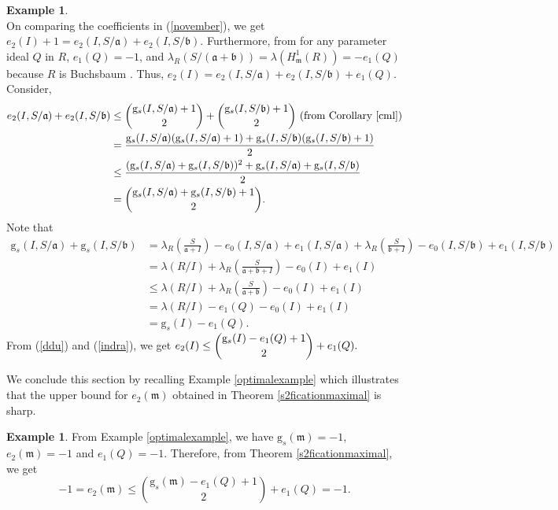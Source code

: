 \documentclass[reqno,a4paper,dvipsnames]{amsart}
\newcommand{\m}{\mathfrak{m} }
\theoremstyle{definition}
\newtheorem{example}[theorem]{Example}
\begin{document}
\begin{example}
\begin{equation}
     \end{equation}
     On comparing the coefficients in (\ref{november}), we get 
     $e_{2}(I)+1=e_{2}(I,S/\mathfrak a)+e_{2}(I,S/\mathfrak b).$ Furthermore, from \cite[Example 4.7]{gghv} for any parameter ideal $Q$ in $R$,   $e_{1}(Q)=-1$, and
     $\lambda_{R}(S/(\mathfrak a+\mathfrak b))=\lambda\left(H^{1}_{\m}(R)\right)=-e_{1}(Q)$ because $R$ is Buchsbaum \cite[Chapter 1, Propositions 2.6 and 2.7]{sv}. 
         Thus,  $e_{2}(I)=e_{2}(I,S/\mathfrak a)+e_{2}(I,S/\mathfrak b)+e_{1}(Q).$  Consider, 
         \begin{align} \nonumber
           e_{2}(I,S/\mathfrak a) +e_{2}(I,S/\mathfrak b) &\leq   \binom{\mathrm{g}_{s}(I,S/\mathfrak a)+1}{2}+ \binom{\mathrm{g}_{s}(I,S/\mathfrak b)+1}{2} \text{ (from Corollary \ref{cml})}\\ \nonumber
             &= \frac{\mathrm{g}_{s}(I,S/\mathfrak a)(\mathrm{g}_{s}(I,S/\mathfrak a)+1)+\mathrm{g}_{s}(I,S/\mathfrak b)(\mathrm{g}_{s}(I,S/\mathfrak b)+1)}{2}\\ \nonumber
                       & \leq \frac{(\mathrm{g}_{s}(I,S/\mathfrak a)+\mathrm{g}_{s}(I,S/\mathfrak b))^{2}+\mathrm{g}_{s}(I,S/\mathfrak a)+\mathrm{g}_{s}(I,S/\mathfrak b)}{2} \\ \label{ddu}
            & = \binom{\mathrm{g}_{s}(I,S/\mathfrak a)+\mathrm{g}_{s}(I,S/\mathfrak b)+1}{2}.
         \end{align}
        Note that \begin{align} \nonumber
            \mathrm{g}_{s}(I,S/\mathfrak a)+\mathrm{g}_{s}(I,S/\mathfrak b)&= \lambda_{R}\left(\frac{S}{\mathfrak a+I}\right)-e_{0}(I,S/\mathfrak a)+e_{1}(I,S/\mathfrak a)+\lambda_{R}\left(\frac{S}{\mathfrak b+I}\right)-e_{0}(I,S/\mathfrak b)+e_{1}(I,S/\mathfrak b)\\ \nonumber
           &=\lambda(R/I)+\lambda_{R}\left(\frac{S}{\mathfrak a+ \mathfrak b+I}\right)-e_{0}(I)+e_{1}(I)\\
           & \leq \lambda(R/I)+\lambda_{R}\left(\frac{S}{\mathfrak a+ \mathfrak b}\right)-e_{0}(I)+e_{1}(I)\\ \nonumber
             & = \lambda(R/I)-e_{1}(Q)-e_{0}(I)+e_{1}(I)\\ \label{indra}
             & =\mathrm{g}_{s}(I)-e_{1}(Q).
        \end{align}
        From (\ref{ddu}) and (\ref{indra}), we get 
        $e_{2}(I) \leq \dbinom{\mathrm{g}_{s}(I)-e_{1}(Q)+1}{2}+e_{1}(Q).$
\end{example}
We conclude this section by recalling Example \ref{optimalexample} which  illustrates that the upper bound for  $e_{2}(\m)$ obtained in Theorem \ref{s2ficationmaximal} is sharp.
\begin{example}
    From Example \ref{optimalexample}, we have $\mathrm{g}_{s}(\m)=-1$, $e_{2}(\m)=-1$ and $e_{1}(Q)=-1.$ Therefore, from Theorem \ref{s2ficationmaximal}, we get $$-1=e_{2}(\m)\leq\binom{\mathrm{g}_{s}(\m)-e_{1}(Q)+1}{2}+e_{1}(Q)=-1.$$
\end{example}
\end{document}
